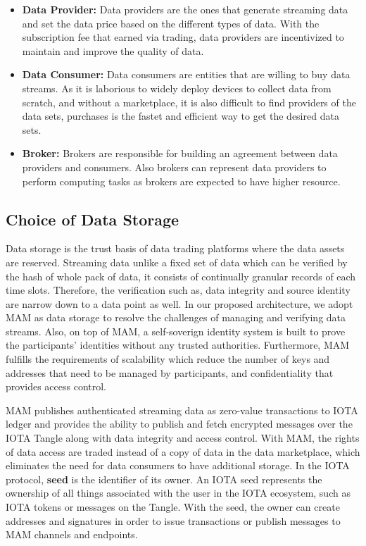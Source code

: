 \documentclass[conference]{IEEEtran}
\begin{document}
\begin{itemize}
\item \textbf{Data Provider: }
Data providers are the ones that generate streaming data and set the data price based on the different types of data. With the subscription fee that earned via trading, data providers are incentivized to maintain and improve the quality of data.
\item \textbf{Data Consumer: }
Data consumers are entities that are willing to buy data streams. As it is laborious to widely deploy devices to collect data from scratch, and without a marketplace, it is also difficult to find providers of the data sets, purchases is the fastet and efficient way to get the desired data sets. 
\item \textbf{Broker: }
Brokers are responsible for building an agreement between data providers and consumers. Also brokers can represent data providers to perform computing tasks as brokers are expected to have higher resource. 
\end{itemize}

\subsection{Choice of Data Storage}
Data storage is the trust basis of data trading platforms where the data assets are reserved. Streaming data unlike a fixed set of data which can be verified by the hash of whole pack of data, it consists of continually granular records of each time slots. Therefore, the verification such as, data integrity and source identity are narrow down to a data point as well. In our proposed architecture, we adopt MAM as data storage to resolve the challenges of managing and verifying data streams. Also, on top of MAM, a self-soverign identity system is built to prove the participants' identities without any trusted authorities. Furthermore, MAM fulfills the requirements of scalability which reduce the number of keys and addresses that need to be managed by participants, and confidentiality that provides access control.

MAM publishes authenticated streaming data as zero-value transactions to IOTA ledger and provides the ability to publish and fetch encrypted messages over the IOTA Tangle along with data integrity and access control. With MAM, the rights of data access are traded instead of a copy of data in the data marketplace, which eliminates the need for data consumers to have additional storage. In the IOTA protocol, \textbf{seed} is the identifier of its owner. An IOTA seed represents the ownership of all things associated with the user in the IOTA ecosystem, such as IOTA tokens or messages on the Tangle. With the seed, the owner can create addresses and signatures in order to issue transactions or publish messages to MAM channels and endpoints.
\end{document}
